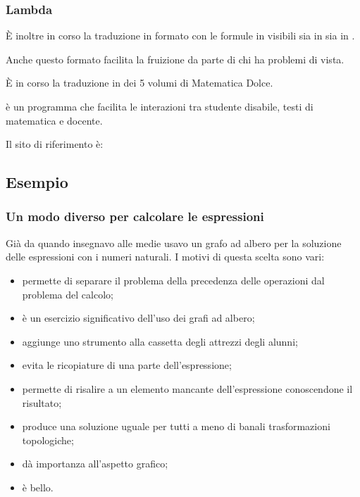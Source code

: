 \documentclass{beamer} %
\begin{document}
\begin{frame}\frametitle{Lambda}

È inoltre in corso la traduzione in formato  con le formule 
in  visibili sia in \blue{\LaTeX} sia in . 

\bigskip
Anche questo formato facilita la fruizione da parte di chi ha problemi di 
vista.

\bigskip
È in corso la traduzione in  dei 5 volumi di Matematica Dolce.

\bigskip

 è un programma che facilita le interazioni tra studente 
disabile, testi di matematica e docente.

\bigskip
Il sito di riferimento è:

\begin{center}
\end{center}

\end{frame}


\subsection{Esempio} 


\begin{frame}\frametitle{Un modo diverso per calcolare le espressioni}

Già da quando insegnavo alle medie usavo un grafo ad 
albero per la soluzione delle espressioni con i numeri naturali. 
I motivi di questa scelta sono vari:

\begin{itemize} %
\item permette di separare il problema della precedenza delle operazioni dal 
problema del calcolo;
\item è un esercizio significativo dell'uso dei grafi ad albero;
\item aggiunge uno strumento alla cassetta degli attrezzi degli alunni;
\item evita le ricopiature di una parte dell'espressione;
\item permette di risalire a un elemento mancante dell'espressione 
conoscendone il risultato;
\item produce una soluzione uguale per tutti a meno di banali 
trasformazioni topologiche;
\item dà importanza all'aspetto grafico;
\item è bello.
\end{itemize}

\end{frame}
\end{document}
